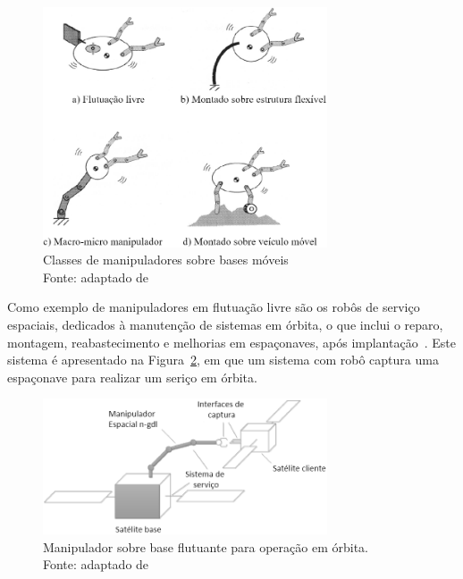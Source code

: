 \begin{figure}[h]
	\centering 
 	\includegraphics[width=0.75\textwidth]{figs/classes_bases}
 	\caption[Classes de manipuladores sobre bases móveis]{Classes de
 	manipuladores sobre bases móveis \\ Fonte: adaptado de
 	\cite{yoshida1996moving}}
 	\label{fig::classes_bases}
\end{figure}

Como exemplo de manipuladores em flutuação livre são os robôs de serviço
espaciais, dedicados à manutenção de sistemas em órbita, o que inclui
o reparo, montagem, reabastecimento e melhorias em espaçonaves, após
implantação~\cite{flores2014review}. Este sistema é apresentado na
Figura~\ref{fig::space_robot}, em que um sistema com robô captura uma
espaçonave  para realizar um seriço em órbita.

\begin{figure}[h]
	\centering 
 	\includegraphics[width=0.75\textwidth]{figs/space_robot}
 	\caption[Manipulador sobre base flutuante em órbita]{Manipulador sobre base
 	flutuante para operação em órbita. \\ Fonte: adaptado de
 	\cite{flores2014review}}
 	\label{fig::space_robot}
\end{figure}


